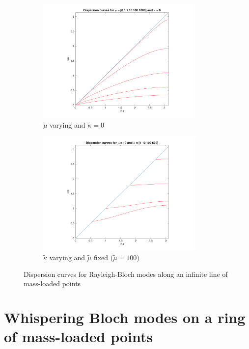 \documentclass[11pt]{report}
\numberwithin{equation}{section}
\begin{document}
\begin{figure} [H]
    \begin{subfigure}{0.5 \textwidth}
    \centering
    \includegraphics[width = 0.9\textwidth]{Disp_mu}
    \caption{$\tilde{\mu}$ varying and $\tilde{\kappa} = 0$}
    \label{fig:my_label}
    \end{subfigure}
    \begin{subfigure}{0.5 \textwidth}
    \centering
    \includegraphics[width = 0.9\textwidth]{Disp_kappa}
    \caption{$\tilde{\kappa}$ varying and $\tilde{\mu}$ fixed ($\tilde{\mu} = 100$)}
    \label{fig:my_label}
    \end{subfigure}
    \caption{Dispersion curves for Rayleigh-Bloch modes along an infinite line of mass-loaded points}
\end{figure}

\chapter{Whispering Bloch modes on a ring of mass-loaded points}
\end{document}

